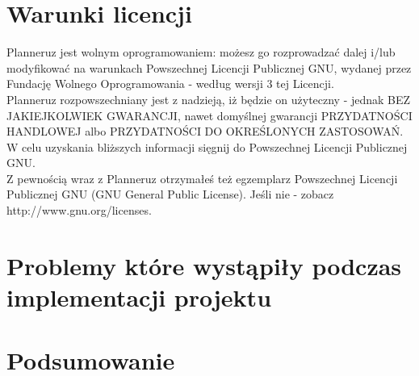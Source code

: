 \documentclass[a4paper,11pt]{uzreport}
\begin{document}
\section{Warunki licencji}

    Planneruz jest wolnym oprogramowaniem: możesz go rozprowadzać dalej
    i/lub modyfikować na warunkach Powszechnej Licencji Publicznej GNU,
    wydanej przez Fundację Wolnego Oprogramowania - według wersji 3 tej
    Licencji.\\

    Planneruz rozpowszechniany jest z nadzieją, iż będzie on
    użyteczny - jednak BEZ JAKIEJKOLWIEK GWARANCJI, nawet domyślnej
    gwarancji PRZYDATNOŚCI HANDLOWEJ albo PRZYDATNOŚCI DO OKREŚLONYCH
    ZASTOSOWAŃ. W celu uzyskania bliższych informacji sięgnij do Powszechnej Licencji Publicznej GNU.\\

    Z pewnością wraz z Planneruz otrzymałeś też egzemplarz
    Powszechnej Licencji Publicznej GNU (GNU General Public License).
    Jeśli nie - zobacz http://www.gnu.org/licenses.\\

\section{Problemy które wystąpiły podczas implementacji projektu}

\section{Podsumowanie}
\end{document}

